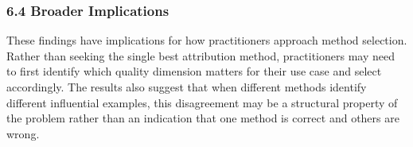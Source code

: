 \subsubsection{6.4 Broader Implications}

These findings have implications for how practitioners approach method selection. Rather than seeking the single best attribution method, practitioners may need to first identify which quality dimension matters for their use case and select accordingly. The results also suggest that when different methods identify different influential examples, this disagreement may be a structural property of the problem rather than an indication that one method is correct and others are wrong.
